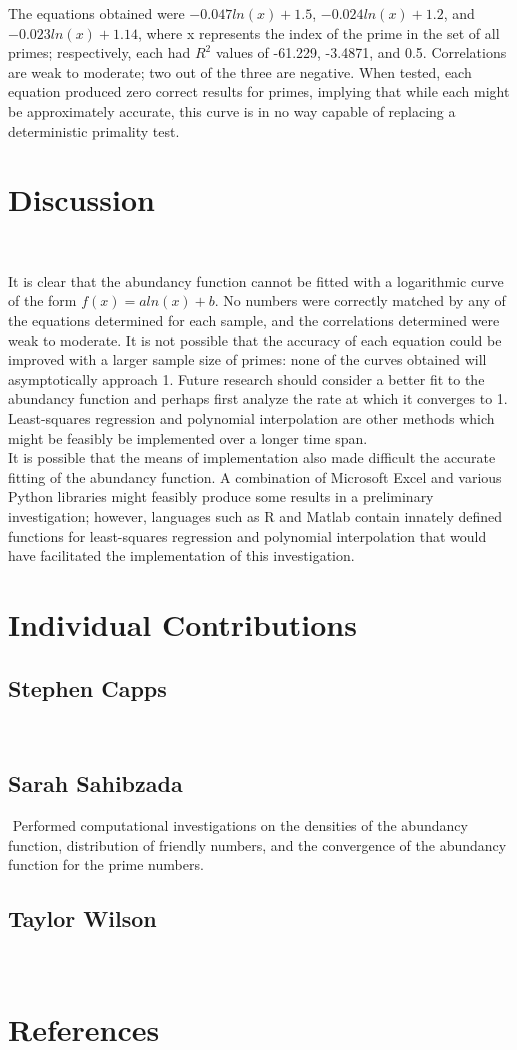 \documentclass[11pt]{article}
\begin{document}
 The equations obtained were $-0.047ln(x) + 1.5$, $-0.024ln(x) + 1.2$, and $-0.023ln(x) + 1.14$, where x represents the index of the prime in the set of all primes; respectively, each had $R^{2}$ values of -61.229, -3.4871, and 0.5. Correlations are weak to moderate; two out of the three are negative. When tested, each equation produced zero correct results for primes, implying that while each might be approximately accurate, this curve is in no way capable of replacing a deterministic primality test.
\section{Discussion}$ $

It is clear that the abundancy function cannot be fitted with a logarithmic curve of the form $f(x) = aln(x) + b$. No numbers were correctly matched by any of the equations determined for each sample, and the correlations determined were weak to moderate. It is not possible that the accuracy of each equation could be improved with a larger sample size of primes: none of the curves obtained will asymptotically approach 1. Future research should consider a better fit to the abundancy function and perhaps first analyze the rate at which it converges to 1. Least-squares regression and polynomial interpolation are other methods which might be feasibly be implemented over a longer time span.
\\It is possible that the means of  implementation also made difficult the accurate fitting of the abundancy function. A combination of Microsoft Excel and various Python libraries might feasibly produce some results in a preliminary investigation; however, languages such as R and Matlab contain innately defined functions for least-squares regression and polynomial interpolation that would have facilitated the implementation of this investigation.



\indent  
\section{Individual Contributions}
\subsection{Stephen Capps}$ $
\indent   
\subsection{Sarah Sahibzada}$ $
\indent Performed computational investigations on the densities of the abundancy function, distribution of friendly numbers, and the convergence of the abundancy function for the prime numbers. 
\subsection{Taylor Wilson}$ $
\indent 

\newpage
\section{References}
\end{document}
